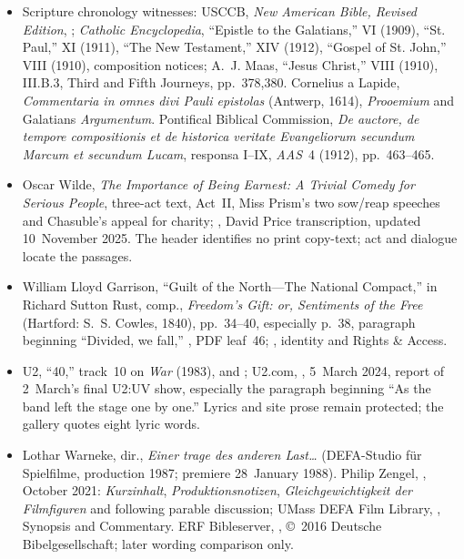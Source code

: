 {\begin{itemize}[leftmargin=1.1em,labelsep=0.35em,itemsep=0.10em,topsep=0.15em,parsep=0pt]
\item Scripture chronology witnesses: USCCB, \emph{New American Bible,
Revised Edition}, ;
\emph{Catholic Encyclopedia}, ``Epistle to the Galatians,'' VI (1909),
``St. Paul,'' XI (1911), ``The New Testament,'' XIV (1912),
``Gospel of St. John,'' VIII (1910), composition notices;
A.~J. Maas, ``Jesus Christ,'' VIII (1910), III.B.3, Third and Fifth
Journeys, pp.~378,380. Cornelius a Lapide, \emph{Commentaria in omnes
divi Pauli epistolas} (Antwerp, 1614), \emph{Prooemium} and
Galatians \emph{Argumentum}. Pontifical Biblical Commission,
\emph{De auctore, de tempore compositionis et de historica veritate
Evangeliorum secundum Marcum et secundum Lucam}, responsa I--IX,
\emph{AAS}~4 (1912), pp.~463--465.

\item Oscar Wilde, \emph{The Importance of Being Earnest: A Trivial
Comedy for Serious People}, three-act text, Act~II, Miss Prism's two
sow/reap speeches and Chasuble's appeal for charity;
, David Price
transcription, updated 10~November 2025. The header identifies no print
copy-text; act and dialogue locate the passages.

\item William Lloyd Garrison, ``Guilt of the North---The National Compact,''
in Richard Sutton Rust, comp., \emph{Freedom's Gift: or, Sentiments of
the Free} (Hartford: S.~S. Cowles, 1840), pp.~34--40,
especially p.~38, paragraph beginning ``Divided, we fall,''
,
PDF leaf~46; ,
identity and Rights \& Access.

\item U2, ``40,'' track~10 on \emph{War} (1983),
 and
; U2.com,
,
5~March 2024, report of 2~March's final U2:UV show, especially the
paragraph beginning ``As the band left the stage one by one.'' Lyrics
and site prose remain protected; the gallery quotes eight lyric words.

\item Lothar Warneke, dir., \emph{Einer trage des anderen Last\ldots}
(DEFA-Studio für Spielfilme, production 1987; premiere 28~January 1988).
Philip Zengel, ,
October 2021: \emph{Kurzinhalt}, \emph{Produktionsnotizen},
\emph{Gleichgewichtigkeit der Filmfiguren} and following parable discussion;
UMass DEFA Film Library, ,
Synopsis and Commentary. ERF Bibleserver,
,
©~2016 Deutsche Bibelgesellschaft; later wording comparison only.


\end{itemize}}
